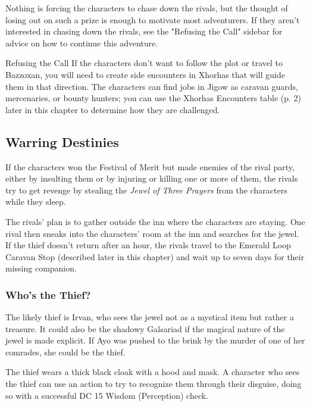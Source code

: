 \documentclass[a4paper, 11pt, bg=full, twocolumn, nooutline]{dndbook}
\begin{document}
Nothing is forcing the characters to chase down the rivals, but the thought of losing out on such a prize is enough to motivate most adventurers. If they aren't interested in chasing down the rivals, see the "Refusing the Call" sidebar for advice on how to continue this adventure.

\begin{DndSidebar}{Refusing the Call}
If the characters don't want to follow the plot or travel to Bazzoxan, you will need to create side encounters in Xhorhas that will guide them in that direction. The characters can find jobs in Jigow as caravan guards, mercenaries, or bounty hunters; you can use the Xhorhas Encounters table (p. 2) later in this chapter to determine how they are challenged.
\end{DndSidebar}

\subsection{Warring Destinies}

If the characters won the Festival of Merit but made enemies of the rival party, either by insulting them or by injuring or killing one or more of them, the rivals try to get revenge by stealing the \textit{Jewel of Three Prayers} from the characters while they sleep.

The rivals' plan is to gather outside the inn where the characters are staying. One rival then sneaks into the characters' room at the inn and searches for the jewel. If the thief doesn't return after an hour, the rivals travel to the Emerald Loop Caravan Stop (described later in this chapter) and wait up to seven days for their missing companion.

\subsubsection{Who's the Thief?}

The likely thief is Irvan, who sees the jewel not as a mystical item but rather a treasure. It could also be the shadowy Galsariad if the magical nature of the jewel is made explicit. If Ayo was pushed to the brink by the murder of one of her comrades, she could be the thief.

The thief wears a thick black cloak with a hood and mask. A character who sees the thief can use an action to try to recognize them through their disguise, doing so with a successful DC 15 Wisdom (Perception) check.
\end{document}
